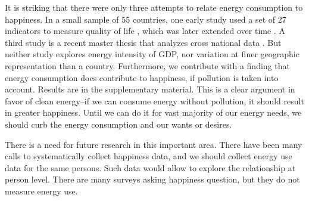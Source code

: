 \documentclass[10pt, letterpaper]{article}
\begin{document}
\begin{spacing}{1.4}
It is striking that there were only three  attempts to
relate energy consumption to happiness.   %
 In a small sample of 55 countries, one early study used a set of 27 indicators to measure
 quality of life \cite{mazur74}, which was later extended over time \cite{mazur11}.
 A third study is a recent master
 thesis that  analyzes cross national data \cite{winfrey13}. But neither
 study  explores energy intensity of GDP, nor variation at finer geographic representation than a country.
Furthermore, we contribute with a finding that energy consumption does contribute to happiness, if pollution is
taken into account. Results are in the supplementary material. This is a clear argument in favor of clean energy--if we can
consume energy without pollution, it should result in greater happiness. Until
we can do it for vast majority of our energy needs, we should curb the energy consumption and
our wants or desires.

There is a need for future research in this important area. There have been many
calls to systematically collect happiness data, and we should collect energy use data for the same persons. Such data would allow
to explore the relationship  at person level. There are many surveys
asking happiness question, but they do not measure energy use. 




\end{spacing}
\end{document}
